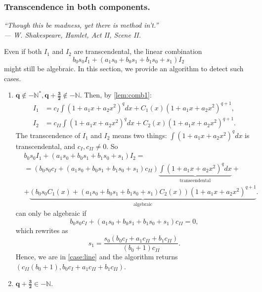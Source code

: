 \documentclass[11pt]{article}
\theoremstyle{definition}
\theoremstyle{plain}
\theoremstyle{remark}
\begin{document}
\subsubsection{Transcendence in both components.}
\begin{flushright}
\footnotesize\itshape
``Though this be madness, yet there is method in’t.''\\
\textup{--- W. Shakespeare, \textit{Hamlet}, Act II, Scene II.}
\end{flushright}
Even if both $I_1$ and $I_2$ are transcendental, the linear combination
\[
b_0s_0 I_1 + (a_1s_0 + b_0s_1 + b_1s_0 + s_1)I_2
\]
might still be algebraic. In this section, we provide an algorithm to detect such cases.
\begin{enumerate}
\item $\mathbf{q\notin -\mathbb{N}^*, q+\frac{3}{2}\notin -\mathbb{N}}$. Then, by \cref{lem:comb1}:
\begin{align*}
I_1 &= c_{I}\int{(1+a_1x+a_2x^2)^qdx} + C_1(x)(1+a_1x+a_2x^2)^{q+1},\\
I_2 &= c_{II}\int{(1+a_1x+a_2x^2)^qdx} + C_2(x)(1+a_1x+a_2x^2)^{q+1}.
\end{align*}
The transcendence of $I_1$ and $I_2$ means two things: $\int{(1+a_1x+a_2x^2)^qdx}$ is transcendental, and $c_I,c_{II}\neq 0$. So
\begin{align*}
& b_0s_0 I_1 + (a_1s_0 + b_0s_1 + b_1s_0 + s_1)I_2 =\\ &= (b_0s_0c_I + (a_1s_0 + b_0s_1 + b_1s_0 + s_1)c_{II})\underbrace{\int{(1+a_1x+a_2x^2)^qdx}}_{\text{transcendental}} +\\&+ \underbrace{(b_0s_0C_1(x)+(a_1s_0 + b_0s_1 + b_1s_0 + s_1)C_2(x))(1+a_1x+a_2x^2)^{q+1}}_{\text{algebraic}}.
\end{align*}
can only be algebraic if 
\[b_0s_0c_I + (a_1s_0 + b_0s_1 + b_1s_0 + s_1)c_{II} = 0,\] 
which rewrites as 
\[s_1=\frac{s_0(b_0c_I + a_1c_{II}+b_1c_{II})}{(b_0+1)c_{II}}.\]
Hence, we are in \cref{case:line} and the algorithm returns $(c_{II}(b_0+1),b_0c_I + a_1c_{II}+b_1c_{II})$.
\item $\mathbf{q+\frac{3}{2}\in -\mathbb{N}}$.


\end{enumerate}
\end{document}
